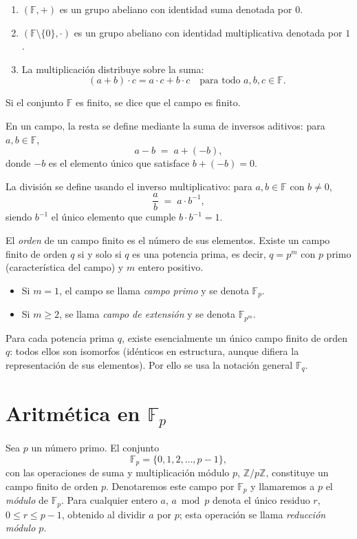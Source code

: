 \begin{enumerate}
  \item $(\mathbb{F},+)$ es un grupo abeliano con identidad suma denotada por $0$.
  \item $(\mathbb{F}\setminus\{0\},\cdot)$ es un grupo abeliano con identidad multiplicativa denotada por $1$.
  \item La multiplicación distribuye sobre la suma:
    \[
      (a + b)\cdot c = a\cdot c + b\cdot c
      \quad\text{para todo }a,b,c\in\mathbb{F}.
    \]
\end{enumerate}

Si el conjunto \(\mathbb{F}\) es finito, se dice que el campo es finito.  

En un campo, la resta se define mediante la suma de inversos aditivos: para \(a,b\in\mathbb{F}\),  
\[
  a - b \;=\; a + (-b),
\]
donde \(-b\) es el elemento único que satisface \(b + (-b) = 0\).  

La división se define usando el inverso multiplicativo: para \(a,b\in\mathbb{F}\) con \(b\neq0\),
\[
  \frac{a}{b} \;=\; a \cdot b^{-1},
\]
siendo \(b^{-1}\) el único elemento que cumple \(b\cdot b^{-1}=1\).  

El \emph{orden} de un campo finito es el número de sus elementos. Existe un campo finito de orden \(q\) si y solo si \(q\) es una potencia prima, es decir, \(q = p^m\) con \(p\) primo (característica del campo) y \(m\) entero positivo.  

\begin{itemize}
  \item Si \(m=1\), el campo se llama \emph{campo primo} y se denota \(\mathbb{F}_p\).  
  \item Si \(m\ge2\), se llama \emph{campo de extensión} y se denota \(\mathbb{F}_{p^m}\).  
\end{itemize}

Para cada potencia prima \(q\), existe esencialmente un único campo finito de orden \(q\): todos ellos son isomorfos (idénticos en estructura, aunque difiera la representación de sus elementos). Por ello se usa la notación general \(\mathbb{F}_q\).  



\section{Aritmética en \texorpdfstring{$\mathbb{F}_p$}{Fp}}
Sea $p$ un número primo. El conjunto
$$
  \mathbb{F}_p = \{0,1,2,\dots,p-1\},
$$
con las operaciones de suma y multiplicación módulo $p$, $\mathbb{Z}/p\mathbb{Z}$, constituye un campo finito de orden $p$. Denotaremos este campo por $\mathbb{F}_p$ y llamaremos a $p$ el \emph{módulo} de $\mathbb{F}_p$. Para cualquier entero $a$, $a \bmod p$ denota el único residuo $r$, $0\le r\le p-1$, obtenido al dividir $a$ por $p$; esta operación se llama \emph{reducción módulo $p$}.

